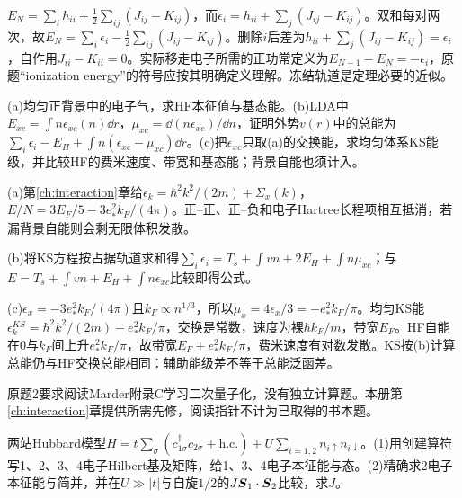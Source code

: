 \begin{solution}
$E_N=\sum_ih_{ii}+\frac12\sum_{ij}(J_{ij}-K_{ij})$，而$\epsilon_i=h_{ii}+\sum_j(J_{ij}-K_{ij})$。双和每对两次，故$E_N=\sum_i\epsilon_i-\frac12\sum_{ij}(J_{ij}-K_{ij})$。删除$i$后差为$h_{ii}+\sum_j(J_{ij}-K_{ij})=\epsilon_i$，自作用$J_{ii}-K_{ii}=0$。实际移走电子所需的正功常定义为$E_{N-1}-E_N=-\epsilon_i$，原题“ionization energy”的符号应按其明确定义理解。冻结轨道是定理必要的近似。
\end{solution}
\begin{exercise}[原题1(a)--(c)]
(a)均匀正背景中的电子气，求HF本征值与基态能。(b)LDA中$E_{xc}=\int n\epsilon_{xc}(n)\dd r$，$\mu_{xc}=\dd(n\epsilon_{xc})/\dd n$，证明外势$v(r)$中的总能为$\sum_i\epsilon_i-E_H+\int n(\epsilon_{xc}-\mu_{xc})\dd r$。(c)把$\epsilon_{xc}$只取(a)的交换能，求均匀体系KS能级，并比较HF的费米速度、带宽和基态能；背景自能也须计入。
\end{exercise}
\begin{solution}
(a)第\ref{ch:interaction}章给$\epsilon_k=\hbar^2k^2/(2m)+\Sigma_x(k)$，$E/N=3E_F/5-3e_*^2k_F/(4\pi)$。正--正、正--负和电子Hartree长程项相互抵消，若漏背景自能则会剩无限体积发散。

(b)将KS方程按占据轨道求和得$\sum_i\epsilon_i=T_s+\int vn+2E_H+\int n\mu_{xc}$；与$E=T_s+\int vn+E_H+\int n\epsilon_{xc}$比较即得公式。

(c)$\epsilon_x=-3e_*^2k_F/(4\pi)$且$k_F\propto n^{1/3}$，所以$\mu_x=4\epsilon_x/3=-e_*^2k_F/\pi$。均匀KS能$\epsilon_k^{KS}=\hbar^2k^2/(2m)-e_*^2k_F/\pi$，交换是常数，速度为裸$\hbar k_F/m$，带宽$E_F$。HF自能在0与$k_F$间上升$e_*^2k_F/\pi$，故带宽$E_F+e_*^2k_F/\pi$，费米速度有对数发散。KS按(b)计算总能仍与HF交换总能相同：辅助能级差不等于总能泛函差。
\end{solution}
原题2要求阅读Marder附录C学习二次量子化，没有独立计算题。本册第\ref{ch:interaction}章提供所需先修，阅读指针不计为已取得的书本题。
\begin{exercise}[原题1--2]
两站Hubbard模型$H=t\sum_\sigma(c_{1\sigma}^\dagger c_{2\sigma}+\mathrm{h.c.})+U\sum_{i=1,2}n_{i\uparrow}n_{i\downarrow}$。(1)用创建算符写1、2、3、4电子Hilbert基及矩阵，给1、3、4电子本征能与态。(2)精确求2电子本征能与简并，并在$U\gg|t|$与自旋$1/2$的$J\boldsymbol{S}_1\cdot\boldsymbol{S}_2$比较，求$J$。
\end{exercise}
